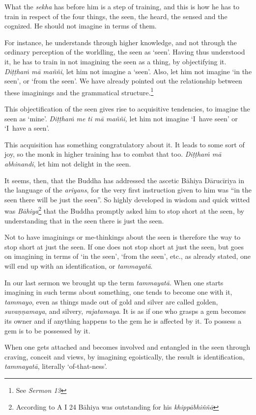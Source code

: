What the \emph{sekha} has before him is a step of training, and this is how he has to train in respect of the four things, the seen, the heard, the sensed and the cognized. He should not imagine in terms of them.

For instance, he understands through higher knowledge, and not through the ordinary perception of the worldling, the seen as `seen'. Having thus understood it, he has to train in not imagining the seen as a thing, by objectifying it. \emph{Diṭṭhaṁ mā maññi}, let him not imagine a `seen'. Also, let him not imagine `in the seen', or `from the seen'. We have already pointed out the relationship between these imaginings and the grammatical structure.\footnote{See \emph{Sermon 13}}

This objectification of the seen gives rise to acquisitive tendencies, to imagine the seen as `mine'. \emph{Diṭṭhaṁ me ti mā maññi,} let him not imagine `I~have seen' or `I~have a seen'.

This acquisition has something congratulatory about it. It leads to some sort of joy, so the monk in higher training has to combat that too. \emph{Diṭṭhaṁ mā abhinandi}, let him not delight in the seen.

It seems, then, that the Buddha has addressed the ascetic Bāhiya Dārucīriya in the language of the \emph{ariyans}, for the very first instruction given to him was ``in the seen there will be just the seen''. So highly developed in wisdom and quick witted was \emph{Bāhiya}\footnote{According to A I 24 Bāhiya was outstanding for his \emph{khippābhiññā}} that the Buddha promptly asked him to stop short at the seen, by understanding that in the seen there is just the seen.

Not to have imaginings or me-thinkings about the seen is therefore the way to stop short at just the seen. If one does not stop short at just the seen, but goes on imagining in terms of `in the seen', `from the seen', etc., as already stated, one will end up with an identification, or \emph{tammayatā}.

In our last sermon we brought up the term \emph{tammayatā}. When one starts imagining in such terms about something, one tends to become one with it, \emph{tammayo}, even as things made out of gold and silver are called golden, \emph{suvaṇṇamaya}, and silvery, \emph{rajatamaya}. It is as if one who grasps a gem becomes its owner and if anything happens to the gem he is affected by it. To possess a gem is to be possessed by it.

When one gets attached and becomes involved and entangled in the seen through craving, conceit and views, by imagining egoistically, the result is identification, \emph{tammayatā}, literally `of-that-ness'.


